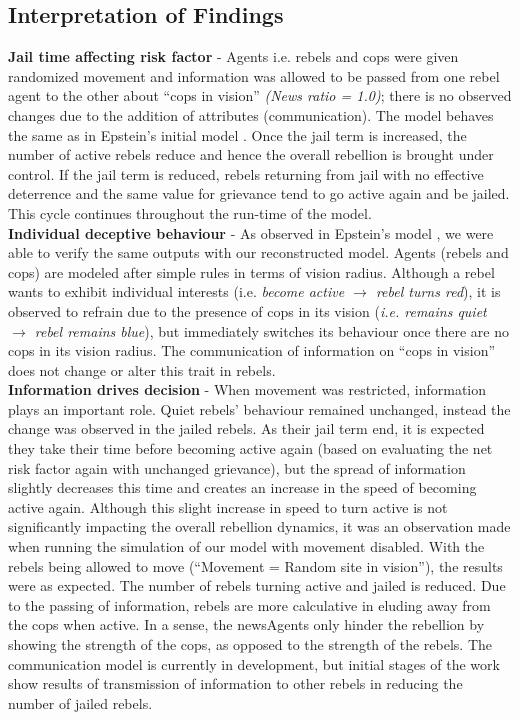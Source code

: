 \documentclass[a4paper,11pt]{article}
\begin{document}
\subsection{Interpretation of Findings}
\textbf{Jail time affecting risk factor} - Agents i.e. rebels and cops were given randomized movement and information was allowed to be passed from one rebel agent to the other about “cops in vision” \textit{(News ratio = 1.0)}; there is no observed changes due to the addition of attributes (communication). The model behaves the same as in Epstein's initial model \cite{epstein2002modeling}. Once the jail term is increased, the number of active rebels reduce and hence the overall rebellion is brought under control. If the jail term is reduced, rebels returning from jail with no effective deterrence and the same value for grievance tend to go active again and be jailed. This cycle continues throughout the run-time of the model. 
\\

\textbf{Individual deceptive behaviour} - 
As observed in Epstein’s model \cite{epstein2002modeling}, we were able to verify the same outputs with our reconstructed model. Agents (rebels and cops) are modeled after simple rules in terms of vision radius. Although a rebel wants to exhibit individual interests (i.e. \textit{become active $\rightarrow$ rebel turns red}), it is observed to refrain due to the presence of cops in its vision (\textit{i.e. remains quiet $\rightarrow$ rebel remains blue}), but immediately switches its behaviour once there are no cops in its vision radius. The communication of information on “cops in vision” does not change or alter this trait in rebels. %
\\

\textbf{Information drives decision} - 
When movement was restricted, information plays an important role. Quiet rebels' behaviour remained unchanged, instead the change was observed in the jailed rebels. As their jail term end, it is expected they take their time before becoming active again (based on evaluating the net risk factor again with unchanged grievance), but the spread of information slightly decreases this time and creates an increase in the speed of becoming active again. Although this slight increase in speed to turn active is not significantly impacting the overall rebellion dynamics, it was an observation made when running the simulation of our model with movement disabled. With the rebels being allowed to move (“Movement = Random site in vision”), the results were as expected. The number of rebels turning active and jailed is reduced. Due to the passing of information, rebels are more calculative in eluding away from the cops when active. In a sense, the newsAgents only hinder the rebellion by showing the strength of the cops, as opposed to the strength of the rebels. The communication model is currently in development, but initial stages of the work show results of transmission of information to other rebels in reducing the number of jailed rebels. %
\\
\end{document}
